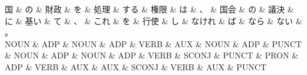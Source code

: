\documentclass[tikz,border=5pt]{standalone}
\begin{document}
\normalsize
\begin{dependency}[edge unit distance=12.0pt]
    \begin{deptext}[column sep=1em]
        国 \& の \& 財政 \& を \& 処理 \& する \& 権限 \& は \& 、 \& 国会 \& の \& 議決 \& に \& 基い \& て \& 、 \& これ \& を \& 行使 \& し \& なけれ \& ば \& なら \& ない \& 。\\
        NOUN \& ADP \& NOUN \& ADP \& VERB \& AUX \& NOUN \& ADP \& PUNCT \& NOUN \& ADP \& NOUN \& ADP \& VERB \& SCONJ \& PUNCT \& PRON \& ADP \& VERB \& AUX \& AUX \& SCONJ \& VERB \& AUX \& PUNCT\\
    \end{deptext}
\end{dependency}
\end{document}
